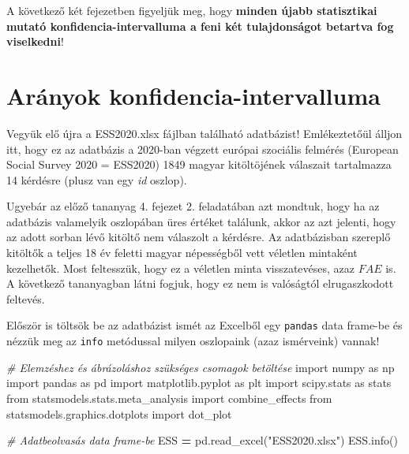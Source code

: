 \documentclass[
]{book}
\newenvironment{Shaded}{\begin{snugshade}}{\end{snugshade}}
\newcommand{\CommentTok}[1]{\textcolor[rgb]{0.56,0.35,0.01}{\textit{#1}}}
\newcommand{\ImportTok}[1]{#1}
\newcommand{\NormalTok}[1]{#1}
\newcommand{\OperatorTok}[1]{\textcolor[rgb]{0.81,0.36,0.00}{\textbf{#1}}}
\newcommand{\StringTok}[1]{\textcolor[rgb]{0.31,0.60,0.02}{#1}}
\begin{document}
A következő két fejezetben figyeljük meg, hogy \textbf{minden újabb statisztikai mutató konfidencia-intervalluma a feni két tulajdonságot betartva fog viselkedni}!

\section{Arányok konfidencia-intervalluma}\label{aruxe1nyok-konfidencia-intervalluma}

Vegyük elő újra a ESS2020.xlsx fájlban található adatbázist! Emlékeztetőül álljon itt, hogy ez az adatbázis a 2020-ban végzett európai szociális felmérés (European Social Survey 2020 = ESS2020) 1849 magyar kitöltöjének válaszait tartalmazza 14 kérdésre (plusz van egy \emph{id} oszlop).

Ugyebár az előző tananyag 4. fejezet 2. feladatában azt mondtuk, hogy ha az adatbázis valamelyik oszlopában üres értéket találunk, akkor az azt jelenti, hogy az adott sorban lévő kitöltő nem válaszolt a kérdésre. Az adatbázisban szereplő kitöltők a teljes 18 év feletti magyar népességből vett véletlen mintaként kezelhetők. Most feltesszük, hogy ez a véletlen minta visszatevéses, azaz \(FAE\) is. A következő tananyagban látni fogjuk, hogy ez nem is valóságtól elrugaszkodott feltevés.

Először is töltsök be az adatbázist ismét az Excelből egy \texttt{pandas} data frame-be és nézzük meg az \texttt{info} metódussal milyen oszlopaink (azaz ismérveink) vannak!

\begin{Shaded}
\begin{Highlighting}[]
\CommentTok{\# Elemzéshez és ábrázoláshoz szükséges csomagok betöltése}
\ImportTok{import}\NormalTok{ numpy }\ImportTok{as}\NormalTok{ np}
\ImportTok{import}\NormalTok{ pandas }\ImportTok{as}\NormalTok{ pd}
\ImportTok{import}\NormalTok{ matplotlib.pyplot }\ImportTok{as}\NormalTok{ plt}
\ImportTok{import}\NormalTok{ scipy.stats }\ImportTok{as}\NormalTok{ stats}
\ImportTok{from}\NormalTok{ statsmodels.stats.meta\_analysis }\ImportTok{import}\NormalTok{ combine\_effects}
\ImportTok{from}\NormalTok{ statsmodels.graphics.dotplots }\ImportTok{import}\NormalTok{ dot\_plot}

\CommentTok{\# Adatbeolvasás data frame{-}be}
\NormalTok{ESS }\OperatorTok{=}\NormalTok{ pd.read\_excel(}\StringTok{"ESS2020.xlsx"}\NormalTok{)}
\NormalTok{ESS.info()}
\end{Highlighting}
\end{Shaded}
\end{document}
